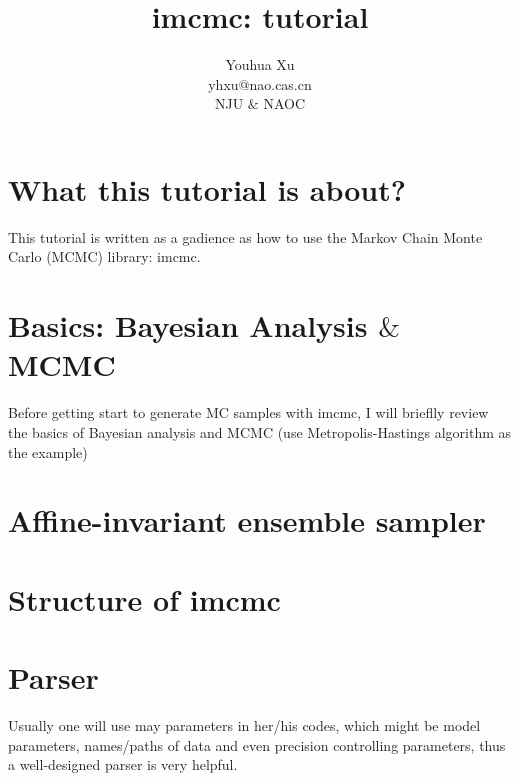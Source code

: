 \documentclass[11pt,a4paper]{article}
\title{imcmc: tutorial}
\author{Youhua Xu\\
	yhxu@nao.cas.cn\\
	NJU $\&$ NAOC}
\begin{document}
\maketitle

\section{What this tutorial is about?}
This tutorial is written as a gadience as how to use the Markov Chain
Monte Carlo (MCMC) library: imcmc.

\section{Basics: Bayesian Analysis $\&$ MCMC}
Before getting start to generate MC samples with imcmc, I will brieflly
review the basics of Bayesian analysis and MCMC (use Metropolis-Hastings
algorithm as the example)


\section{Affine-invariant ensemble sampler}

\section{Structure of \textbf{imcmc}}


\section{Parser}
Usually one will use may parameters in her/his codes, which might be model parameters, names/paths of data and even precision
controlling parameters, thus a well-designed parser is very helpful.
\end{document}
